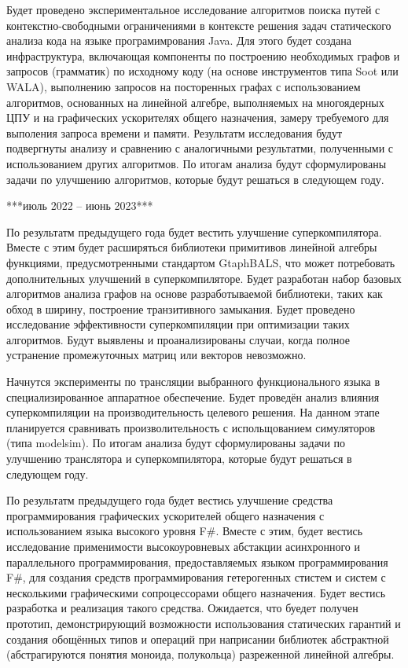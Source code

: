 \documentclass[12pt]{article}  %
\theoremstyle{remark}
\begin{document}
Будет проведено экспериментальное исследование алгоритмов поиска путей с контекстно-свободными ограничениями в контексте решения задач статического анализа кода на языке програмимрования Java. Для этого будет создана инфраструктура, включающая компоненты по построению необходимых графов и запросов (грамматик) по исходному коду (на основе инструментов типа Soot или WALA), выполнению запросов на посторенных графах с использованием алгоритмов, основанных на линейной алгебре, выполняемых на многоядерных ЦПУ и на графических ускорителях общего назначения, замеру требуемого для выполения запроса времени и памяти. Результатм исследования будут подвергнуты анализу и сравнению с аналогичными результатми, полученными с использованием других алгоритмов. По итогам анализа будут сформулированы задачи по улучшению алгоритмов, которые будут решаться в следующем году.


***июль 2022 -- июнь 2023***

По результатм предыдущего года будет вестить улучшение суперкомпилятора. Вместе с этим будет расширяться библиотеки примитивов линейной алгебры функциями, предусмотренными стандартом GtaphBALS, что может потребовать дополнительных улучшений в суперкомпиляторе. Будет разработан набор базовых алгоритмов анализа графов на основе разработываемой библиотеки, таких как обход в ширину, построение транзитивного замыкания. Будет проведено исследование эффективности суперкомпиляции при оптимизации таких алгоритмов. Будут выявлены и проанализированы случаи, когда полное устранение промежуточных матриц или векторов невозможно.

Начнутся эксперименты по трансляции выбранного функционального языка в специализированное аппаратное обеспечение. Будет проведён анализ влияния суперкомпиляции на производительность целевого решения. На данном этапе планируется сравнивать произволительность с испольщованием симуляторов (типа modelsim). По итогам анализа будут сформулированы задачи по улучшению транслятора и суперкомпилятора, которые будут решаться в следующем году. 

По результатм предыдущего года будет вестись улучшение средства программирования графических ускорителей общего назначения с использованием языка высокого уровня F\#. Вместе с этим, будет вестись исследование применимости высокоуровневых абстакции асинхронного и параллельного программирования, предоставляемых языком программирования F\#, для создания средств программирования гетерогенных стистем и систем с несколькими графическими сопроцессорами общего назначения. Будет вестись разработка и реализация такого средства. Ожидается, что буедет получен прототип, демонстрирующий возможности использования статических гарантий и создания обощённых типов и операций при наприсании библиотек абстрактной (абстрагируются понятия моноида, полукольца) разреженной линейной алгебры.
\end{document}
